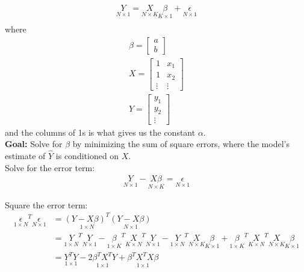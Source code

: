 \documentclass{article}
\begin{document}
\begin{align}
    \underset{N \times 1} Y = \underset{N \times K } X 
                              \underset{K \times 1} \beta +  \underset{ N \times 1} \epsilon\\
\end{align} 
where 
\begin{align}
    \beta = \begin{bmatrix}
        a\\
        b
    \end{bmatrix}\\
    X = \begin{bmatrix}
        1 & x_1\\
        1 & x_2\\
        \vdots & \vdots
    \end{bmatrix}\\
    Y = \begin{bmatrix}
        y_1\\
        y_2\\
        \vdots
    \end{bmatrix}
\end{align}
and the columns of 1s is what gives us the constant $\alpha$.\\

\textbf{Goal:} Solve for $\beta$ by minimizing the sum of square errors, where the model's estimate of $\hat Y$ is conditioned on $X$. \\

Solve for the error term:
\begin{align}
    \underset{N \times 1} Y - \underset{N \times K}{X \beta} = \underset{N \times 1} \epsilon
\end{align}

Square the error term:
\begin{align}
    \underset{1 \times N} \epsilon^T  \underset{N \times 1}\epsilon &= 
        \underset{1 \times N}{(Y - X \beta)^T} \underset{N \times 1}{(Y - X \beta)} \\
    &= \underset{1 \times N}Y^T \underset{N \times 1} Y - \underset{1 \times K} \beta^T \underset{K \times N} X^T \underset{N \times 1} Y - \underset{1 \times N} Y^T \underset{N \times K} X \underset{K \times 1}\beta + \underset{1 \times K}\beta^T \underset{K \times N}X^T \underset{N \times K}X \underset{K \times 1}\beta\\
    &= \underset{1 \times 1}{Y^T Y} - \underset{1 \times 1}{2 \beta^T X^T Y} + \underset{1 \times 1}{\beta^T X^T X \beta}
\end{align}
\end{document}
